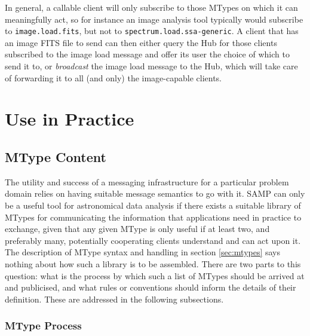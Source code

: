 \documentclass[5p]{elsarticle}
\begin{document}
In general, a callable client will only subscribe to those MTypes on which
it can meaningfully act, so for instance an image analysis tool
typically would subscribe to {\tt image.load.fits},
but not to {\tt spectrum.load.ssa-generic}.
A client that has an image FITS file to send can then
either query the Hub for those clients subscribed to the image load
message and offer its user the choice of which to send it to,
or {\em broadcast} the image load message to the Hub, which will
take care of forwarding it to all (and only) the image-capable clients.

\section{Use in Practice} \label{sec:usage}

\subsection{MType Content}

The utility and success of a messaging infrastructure for
a particular problem domain relies on having suitable
message semantics to go with it.
SAMP can only be a useful tool for astronomical data analysis
if there exists a suitable library of MTypes for communicating
the information that applications need in practice to exchange,
given that any given MType is only useful if at least two,
and preferably many, potentially cooperating clients
understand and can act upon it.
The description of MType syntax and handling in section \ref{sec:mtypes}
says nothing about how such a library is to be assembled.
There are two parts to this question: what is the process by
which such a list of MTypes should be arrived at and publicised,
and what rules or conventions should inform the details of their definition.
These are addressed in the following subsections.

\subsubsection{MType Process}
\end{document}
